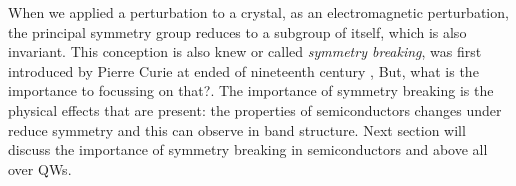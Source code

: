 
When we applied  a perturbation to a crystal, as an electromagnetic perturbation, the principal symmetry group reduces to a subgroup of itself, which is also invariant.
This conception is also knew or called  \emph{symmetry breaking}, was first introduced by Pierre Curie at ended of nineteenth century \cite{curie1894symetrie,sep-symmetry-breaking},
But, what is the importance to focussing on that?. The importance of symmetry breaking is the physical effects that
are present: the properties of semiconductors changes under reduce symmetry and this can observe in band structure. Next section will discuss the importance of symmetry breaking in semiconductors and above all over \gls{QW}s.
